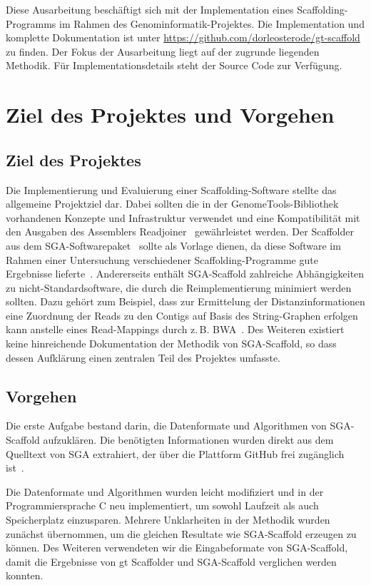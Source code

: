 \documentclass[a4paper,11pt,parskip]{scrartcl}
\begin{document}
Diese Ausarbeitung beschäftigt sich mit der Implementation eines
Scaffolding-Programms im Rahmen des Genominformatik-Projektes. Die
Implementation und komplette Dokumentation ist unter
\url{https://github.com/dorleosterode/gt-scaffold} zu finden. Der Fokus der
Ausarbeitung liegt auf der zugrunde liegenden Methodik. Für
Implementationsdetails steht der Source Code zur Verfügung.

\section{Ziel des Projektes und Vorgehen}
\subsection{Ziel des Projektes}
Die Implementierung und Evaluierung einer Scaffolding-Software stellte
das allgemeine Projektziel dar. Dabei sollten die in der
GenomeTools-Bibliothek~\cite{Gremme:2013} vorhandenen Konzepte und
Infrastruktur verwendet und eine Kompatibilität mit den Ausgaben des
Assemblers Readjoiner~\cite{Gonnella:2012gn} gewährleistet werden. Der
Scaffolder aus dem SGA-Softwarepaket~\cite{Simpson:2012ef} sollte als
Vorlage dienen, da diese Software im Rahmen einer Untersuchung
verschiedener Scaffolding-Programme gute Ergebnisse
lieferte~\cite{Hunt:2014dh}. Andererseits enthält SGA-Scaffold
zahlreiche Abhängigkeiten zu nicht-Standardsoftware, die durch die
Reimplementierung minimiert werden sollten. Dazu gehört zum Beispiel,
dass zur Ermittelung der Distanzinformationen eine Zuordnung der Reads
zu den Contigs auf Basis des String-Graphen erfolgen kann anstelle eines
Read-Mappings durch z.\,B. BWA~\cite{Li:2009}. Des Weiteren existiert keine
hinreichende Dokumentation der Methodik von SGA-Scaffold, so dass
dessen Aufklärung einen zentralen Teil des Projektes umfasste.

\subsection{Vorgehen}
Die erste Aufgabe bestand darin, die Datenformate und Algorithmen
von SGA-Scaffold aufzuklären. Die benötigten Informationen
wurden direkt aus dem Quelltext von SGA extrahiert, der über die
Plattform GitHub frei zugänglich ist~\cite{source}.

Die Datenformate und Algorithmen wurden leicht modifiziert und in
der Programmiersprache C neu implementiert, um sowohl Laufzeit
als auch Speicherplatz einzusparen. Mehrere Unklarheiten in der
Methodik wurden zunächst übernommen, um die gleichen Resultate wie
SGA-Scaffold erzeugen zu können. Des Weiteren verwendeten wir die
Eingabeformate von SGA-Scaffold, damit die Ergebnisse von gt Scaffolder
und SGA-Scaffold verglichen werden konnten.
\end{document}
